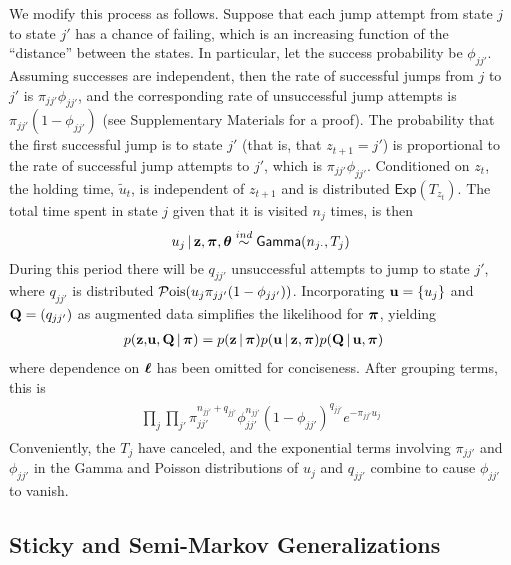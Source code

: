 We modify this process as follows.  
Suppose that each jump attempt from state $j$ to state $j'$ has a
chance of failing, which is an increasing function of the ``distance''
between the states.  In particular, let the success probability be
$\phi_{jj'}$.  Assuming successes are independent, then the rate of 
successful jumps from $j$ to $j'$ is $\pi_{jj'}\phi_{jj'}$, and the 
corresponding rate of unsuccessful jump
attempts is $\pi_{jj'}(1-\phi_{jj'})$ (see Supplementary Materials for
a proof).  The probability that the first successful jump is to
state $j'$ (that is, that $z_{t+1} = j'$) 
is proportional to the rate of successful jump attempts to $j'$, which
is $\pi_{jj'}\phi_{jj'}$.  Conditioned on $z_t$, the holding time, $\tilde{u}_{t}$, is
independent of $z_{t+1}$ and is distributed $\mathsf{Exp}(T_{z_t})$.  The
total time spent in state $j$ given that it is visited $n_{j}$ times,
is then
\begin{equation}
u_j \, \vert \, \mathbf{z}, \boldsymbol{\pi}, \boldsymbol{\theta} \stackrel{ind}{\sim} \mathsf{Gamma}(n_{j\cdot},T_j)
\end{equation}
During this period there will be $q_{jj'}$
unsuccessful attempts to jump to state $j'$, where $q_{jj'}$ is distributed $\mathcal{P}\mathrm{ois}(u_j
\pi_{jj'}(1 - \phi_{jj'}))$.  Incorporating
$\mathbf{u} = \{u_j\}$ and $\mathbf{Q} = (q_{jj'})$ as augmented data simplifies 
the likelihood for $\boldsymbol{\pi}$, yielding
\begin{align}
  p(\mathbf{z}, &\mathbf{u}, \mathbf{Q} \, \vert \, \boldsymbol{\pi}) =  p(\mathbf{z} \, \vert \, \boldsymbol{\pi}) p(\mathbf{u} \, \vert \,
  \mathbf{z}, \boldsymbol{\pi}) p(\mathbf{Q} \, \vert \, \mathbf{u}, \boldsymbol{\pi})
\end{align}
where dependence on $\boldsymbol{\ell}$ has been omitted for conciseness.  After
grouping terms, this is
\begin{align}
\begin{split}
\label{eq:joint-likelihood}
\prod_{j} \prod_{j'} \pi_{jj'}^{n_{jj'} + q_{jj'}} \phi_{jj'}^{n_{jj'}}
  (1-\phi_{jj'})^{q_{jj'}}
  e^{-\pi_{jj'}u_j}
\end{split}
\end{align}
Conveniently, the $T_j$ have canceled, and the exponential terms involving
$\pi_{jj'}$ and $\phi_{jj'}$ in the Gamma and Poisson distributions of
$u_{j}$ and $q_{jj'}$ combine to cause $\phi_{jj'}$ to vanish.

\subsection{Sticky and Semi-Markov Generalizations}
\label{sec:an-hsmm-modification}

